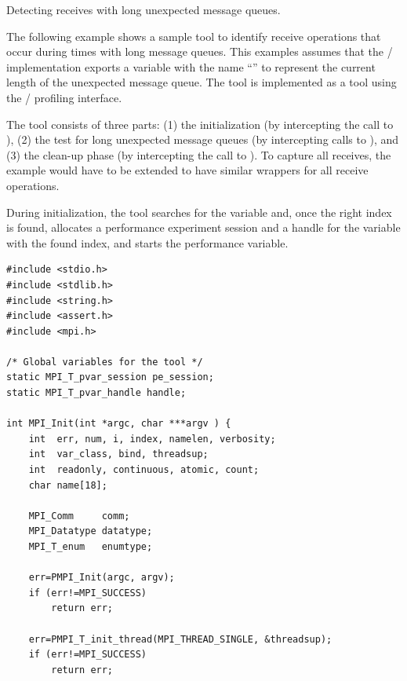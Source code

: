 \begin{example}
%
Detecting receives with long unexpected message queues.

The following example shows a sample tool to identify receive operations
that occur during times with long message queues.  This examples assumes
that the \MPI/ implementation exports a variable with the name
``'' to represent the current length of the
unexpected message queue.  The tool is implemented as a 
tool using the
\MPI/ profiling interface.

The tool consists of three parts: (1) the initialization (by intercepting
the call to ), (2) the test for long unexpected message
queues (by intercepting calls to ), and (3) the clean-up
phase (by intercepting the call to ).  To capture
all receives, the example would have to be extended to have similar
wrappers for all receive operations.

During initialization, the tool searches for the variable and, once the
right index is found, allocates a performance experiment session and a handle for the variable
with the found index, and starts the performance variable.

\begin{lstlisting}[language={[MPI]C},basicstyle=\lstsmall]
#include <stdio.h>
#include <stdlib.h>
#include <string.h>
#include <assert.h>
#include <mpi.h>

/* Global variables for the tool */
static MPI_T_pvar_session pe_session;
static MPI_T_pvar_handle handle;

int MPI_Init(int *argc, char ***argv ) {
    int  err, num, i, index, namelen, verbosity;
    int  var_class, bind, threadsup;
    int  readonly, continuous, atomic, count;
    char name[18];

    MPI_Comm     comm;
    MPI_Datatype datatype;
    MPI_T_enum   enumtype;

    err=PMPI_Init(argc, argv);
    if (err!=MPI_SUCCESS)
        return err;

    err=PMPI_T_init_thread(MPI_THREAD_SINGLE, &threadsup);
    if (err!=MPI_SUCCESS)
        return err;


\end{lstlisting}
\end{example}
